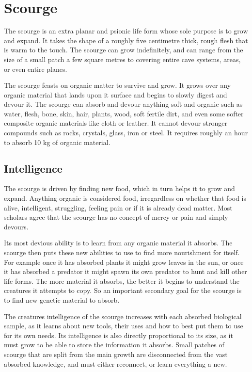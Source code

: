 \section{Scourge}
\label{sec:Scourge}

The scourge is an extra planar and psionic life form whose sole purpose is to
grow and expand. It takes the shape of a roughly five centimetre thick, rough
flesh that is warm to the touch. The scourge can grow indefinitely, and can
range from the size of a small patch a few square metres to covering entire
cave systems, areas, or even entire planes.

The scourge feasts on organic matter to survive and grow. It grows over any
organic material that lands upon it surface and begins to slowly digest and
devour it. The scourge can absorb and devour anything soft and organic such as
water, flesh, bone, skin, hair, plants, wood, soft fertile dirt, and even some
softer composite organic materials like cloth or leather. It cannot devour
stronger compounds such as rocks, crystals, glass, iron or steel. It requires
roughly an hour to absorb 10 kg of organic material.

\subsection{Intelligence}

The scourge is driven by finding new food, which in turn helps it to grow and
expand. Anything organic is considered food, irregardless on whether that food
is alive, intelligent, struggling, feeling pain or if it is already dead
matter. Most scholars agree that the scourge has no concept of mercy or pain
and simply devours.

Its most devious ability is to learn from any organic material it absorbs. The
scourge then puts these new abilities to use to find more nourishment for
itself. For example once it has absorbed plants it might grow leaves in the
sun, or once it has absorbed a predator it might spawn its own predator to
hunt and kill other life forms. The more material it absorbs, the better it
begins to understand the creatures it attempts to copy. So an important
secondary goal for the scourge is to find new genetic material to absorb.

The creatures intelligence of the scourge increases with each absorbed
biological sample, as it learns about new tools, their uses and how to best
put them to use for its own needs. Its intelligence is also directly
proportional to its size, as it must grow to be able to store the information
it absorbs. Small patches of scourge that are split from the main growth
are disconnected from the vast absorbed knowledge, and must either reconnect,
or learn everything a new.

